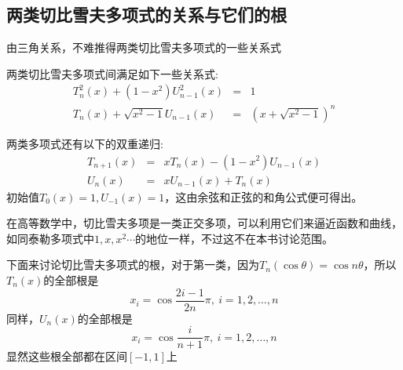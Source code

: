 \subsection{两类切比雪夫多项式的关系与它们的根}
\label{sec:relation-between-two-chebyshev-polynome}

由三角关系，不难推得两类切比雪夫多项式的一些关系式
\begin{property}
  两类切比雪夫多项式间满足如下一些关系式:
  \begin{eqnarray*}
    T_n^2(x)+(1-x^2)U_{n-1}^2(x) & = & 1 \\
    T_n(x)+\sqrt{x^2-1}U_{n-1}(x) & = & (x+\sqrt{x^2-1})^n
  \end{eqnarray*}
\end{property}

两类多项式还有以下的双重递归:
\begin{eqnarray*}
  T_{n+1}(x) & = & xT_n(x)-(1-x^2)U_{n-1}(x) \\
  U_n(x) & = & xU_{n-1}(x)+T_n(x)
\end{eqnarray*}
初始值$T_0(x)=1, U_{-1}(x)=1$，这由余弦和正弦的和角公式便可得出。

在高等数学中，切比雪夫多项是一类正交多项，可以利用它们来逼近函数和曲线，如同泰勒多项式中$1,x,x^2\cdots$的地位一样，不过这不在本书讨论范围。

下面来讨论切比雪夫多项式的根，对于第一类，因为$T_n(\cos{\theta})=\cos{n\theta}$，所以$T_n(x)$的全部根是
\begin{equation*}
  x_i=\cos{\frac{2i-1}{2n}\pi}, \  i=1,2,\ldots,n
\end{equation*}
同样，$U_n(x)$的全部根是
\begin{equation*}
  x_i=\cos{\frac{i}{n+1}\pi}, \  i=1,2,\ldots,n
\end{equation*}
显然这些根全部都在区间$[-1,1]$上

